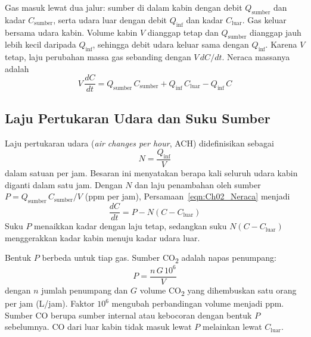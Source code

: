     Gas masuk lewat dua jalur: sumber di dalam kabin dengan debit $Q_{\text{sumber}}$ dan kadar $C_{\text{sumber}}$, serta udara luar dengan debit $Q_{\text{inf}}$ dan kadar $C_{\text{luar}}$. Gas keluar bersama udara kabin. Volume kabin $V$ dianggap tetap dan $Q_{\text{sumber}}$ dianggap jauh lebih kecil daripada $Q_{\text{inf}}$, sehingga debit udara keluar sama dengan $Q_{\text{inf}}$. Karena $V$ tetap, laju perubahan massa gas sebanding dengan $V\,dC/dt$. Neraca massanya adalah
    \begin{equation}
        \label{eqn:Ch02_Neraca}
        V\,\frac{dC}{dt} = Q_{\text{sumber}}\,C_{\text{sumber}} + Q_{\text{inf}}\,C_{\text{luar}} - Q_{\text{inf}}\,C
    \end{equation}

    \subsection{Laju Pertukaran Udara dan Suku Sumber}

    Laju pertukaran udara (\textit{air changes per hour}, ACH) didefinisikan sebagai
    \begin{equation}
        \label{eqn:Ch02_N}
        N = \frac{Q_{\text{inf}}}{V}
    \end{equation}
    dalam satuan per jam. Besaran ini menyatakan berapa kali seluruh udara kabin diganti dalam satu jam. Dengan $N$ dan laju penambahan oleh sumber $P = Q_{\text{sumber}}\,C_{\text{sumber}}/V$ (ppm per jam), Persamaan~\ref{eqn:Ch02_Neraca} menjadi
    \begin{equation}
        \label{eqn:Ch02_Model_Gas}
        \frac{dC}{dt} = P - N\left(C - C_{\text{luar}}\right)
    \end{equation}
    Suku $P$ menaikkan kadar dengan laju tetap, sedangkan suku $N\left(C - C_{\text{luar}}\right)$ menggerakkan kadar kabin menuju kadar udara luar.

    Bentuk $P$ berbeda untuk tiap gas. Sumber CO\textsubscript{2} adalah napas penumpang:
    \begin{equation}
        \label{eqn:Ch02_P_CO2}
        P = \frac{n\,G\,10^{6}}{V}
    \end{equation}
    dengan $n$ jumlah penumpang dan $G$ volume CO\textsubscript{2} yang dihembuskan satu orang per jam (L/jam). Faktor $10^{6}$ mengubah perbandingan volume menjadi ppm. Sumber CO berupa sumber internal atau kebocoran dengan bentuk $P$ sebelumnya. CO dari luar kabin tidak masuk lewat $P$ melainkan lewat $C_{\text{luar}}$.

